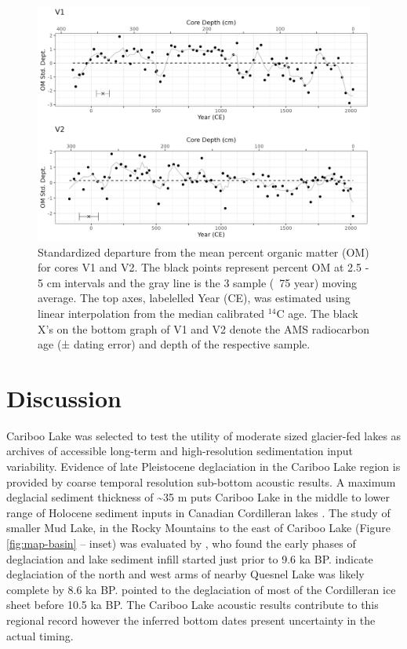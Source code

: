 \documentclass[Royal,times,doublespace,sageh]{sagej}
\begin{document}
\begin{figure}

{\centering \includegraphics[width=1\linewidth]{figs/V1_V2_LOI_vs_depth_and_C14_est_yr} 

}

\caption{Standardized departure from the mean percent organic matter (OM) for cores V1 and V2. The black points represent percent OM at 2.5 - 5 cm intervals and the gray line is the 3 sample (~75 year) moving average. The top axes, labelelled Year (CE), was estimated using linear interpolation from the median calibrated $^{14}$C age. The black X's on the bottom graph of V1 and V2 denote the AMS radiocarbon age (± dating error) and depth of the respective sample.\label{loi}}\label{fig:loi}
\end{figure}

\hypertarget{discussion}{%
\section{Discussion}\label{discussion}}

Cariboo Lake was selected to test the utility of moderate sized
glacier-fed lakes as archives of accessible long-term and
high-resolution sedimentation input variability. Evidence of late
Pleistocene deglaciation in the Cariboo Lake region is provided by
coarse temporal resolution sub-bottom acoustic results. A maximum
deglacial sediment thickness of \textasciitilde35 m puts Cariboo Lake in
the middle to lower range of Holocene sediment inputs in Canadian
Cordilleran lakes \citep[see detailed discussion in][]{Gilbert2012}. The
study of smaller Mud Lake, in the Rocky Mountains to the east of Cariboo
Lake (Figure \ref{fig:map-basin} -- inset) was evaluated by
\citet{Hodder2006b}, who found the early phases of deglaciation and lake
sediment infill started just prior to 9.6 ka BP. \citet{Gilbert2012}
indicate deglaciation of the north and west arms of nearby Quesnel Lake
was likely complete by 8.6 ka BP. \citet{Menounos2009b} pointed to the
deglaciation of most of the Cordilleran ice sheet before 10.5 ka BP. The
Cariboo Lake acoustic results contribute to this regional record however
the inferred bottom dates present uncertainty in the actual timing.
\end{document}
